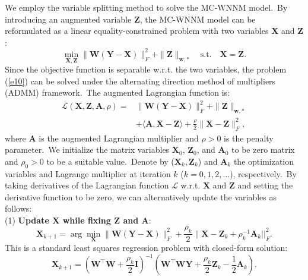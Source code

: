 We employ the variable splitting method \cite{courant1943,Eckstein1992} to solve the MC-WNNM model.\ By introducing an augmented variable $\mathbf{Z}$, the MC-WNNM model can be reformulated as a linear equality-constrained problem with two variables $\mathbf{X}$ and $\mathbf{Z}$:
\begin{equation}
\label{e10}
\min_{\mathbf{X},\mathbf{Z}}\|\mathbf{W}(\mathbf{Y}-\mathbf{X})\|_{F}^{2}
+
\|\mathbf{Z}\|_{\bm{w},*}
\quad
\text{s.t.}
\quad
\mathbf{X}=\mathbf{Z}.
\end{equation}
Since the objective function is separable w.r.t. the two variables, the problem (\ref{e10}) can be solved under the alternating direction method of multipliers (ADMM) \cite{admm} framework.\ The augmented Lagrangian function is:
\begin{equation}
\label{e11}
\begin{split}
\mathcal{L}(\mathbf{X},\mathbf{Z},\mathbf{A},\rho)
=
&\|\mathbf{W}(\mathbf{Y}-\mathbf{X})\|_{F}^{2}
+
\|\mathbf{Z}\|_{\bm{w},*}
\\
&
+
\langle
\mathbf{A},\mathbf{X}-\mathbf{Z}
\rangle
+
\frac{\rho}{2}
\|\mathbf{X}-\mathbf{Z}\|_{F}^{2},
\end{split}
\end{equation}
where $\mathbf{A}$ is the augmented Lagrangian multiplier and $\rho>0$ is the penalty parameter.\ We initialize the matrix variables $\mathbf{X}_{0}$, $\mathbf{Z}_{0}$, and $\mathbf{A}_{0}$ to be zero matrix and $\rho_{0}>0$ to be a suitable value.\ Denote by ($\mathbf{X}_{k}, \mathbf{Z}_{k}$) and $\mathbf{A}_{k}$ the optimization variables and Lagrange multiplier at iteration $k$ ($k=0,1,2,...$), respectively.\ By taking derivatives of the Lagrangian function $\mathcal{L}$ w.r.t. $\mathbf{X}$ and $\mathbf{Z}$ and setting the derivative function to be zero, we can alternatively update the variables as follows:
\\
(1) \textbf{Update $\mathbf{X}$ while fixing $\mathbf{Z}$ and $\mathbf{A}$}:
\begin{equation}
\label{e12}
\mathbf{X}_{k+1}
=
\arg\min_{\mathbf{X}}
\|\mathbf{W}(\mathbf{Y}-\mathbf{X})\|_{F}^{2} 
+
\frac{\rho_{k}}{2}\|\mathbf{X} - \mathbf{Z}_{k} + \rho_{k}^{-1}\mathbf{A}_{k}||_{F}^{2}.
\end{equation}
This is a standard least squares regression problem with closed-form solution:
\begin{equation}
\label{e13}
\mathbf{X}_{k+1}
=
(\mathbf{W}^{\top}\mathbf{W}+\frac{\rho_{k}}{2}\mathbf{I})^{-1}
(\mathbf{W}^{\top}\mathbf{W}\mathbf{Y} + \frac{\rho_{k}}{2}\mathbf{Z}_{k} -\frac{1}{2}\mathbf{A}_{k}).
\end{equation}
